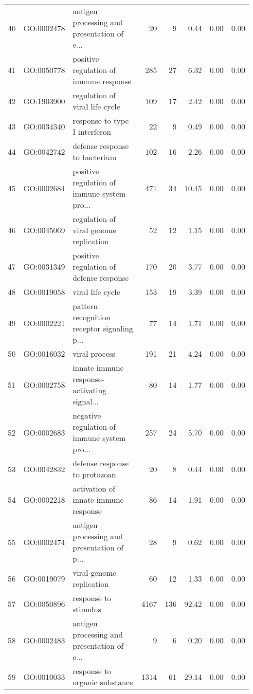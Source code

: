 \begin{table}[ht]
\begin{tabular}{rllrrrrr}
  40 & GO:0002478 & antigen processing and presentation of e... &  20 &   9 & 0.44 & 0.00 & 0.00 \\ 
  41 & GO:0050778 & positive regulation of immune response & 285 &  27 & 6.32 & 0.00 & 0.00 \\ 
  42 & GO:1903900 & regulation of viral life cycle & 109 &  17 & 2.42 & 0.00 & 0.00 \\ 
  43 & GO:0034340 & response to type I interferon &  22 &   9 & 0.49 & 0.00 & 0.00 \\ 
  44 & GO:0042742 & defense response to bacterium & 102 &  16 & 2.26 & 0.00 & 0.00 \\ 
  45 & GO:0002684 & positive regulation of immune system pro... & 471 &  34 & 10.45 & 0.00 & 0.00 \\ 
  46 & GO:0045069 & regulation of viral genome replication &  52 &  12 & 1.15 & 0.00 & 0.00 \\ 
  47 & GO:0031349 & positive regulation of defense response & 170 &  20 & 3.77 & 0.00 & 0.00 \\ 
  48 & GO:0019058 & viral life cycle & 153 &  19 & 3.39 & 0.00 & 0.00 \\ 
  49 & GO:0002221 & pattern recognition receptor signaling p... &  77 &  14 & 1.71 & 0.00 & 0.00 \\ 
  50 & GO:0016032 & viral process & 191 &  21 & 4.24 & 0.00 & 0.00 \\ 
  51 & GO:0002758 & innate immune response-activating signal... &  80 &  14 & 1.77 & 0.00 & 0.00 \\ 
  52 & GO:0002683 & negative regulation of immune system pro... & 257 &  24 & 5.70 & 0.00 & 0.00 \\ 
  53 & GO:0042832 & defense response to protozoan &  20 &   8 & 0.44 & 0.00 & 0.00 \\ 
  54 & GO:0002218 & activation of innate immune response &  86 &  14 & 1.91 & 0.00 & 0.00 \\ 
  55 & GO:0002474 & antigen processing and presentation of p... &  28 &   9 & 0.62 & 0.00 & 0.00 \\ 
  56 & GO:0019079 & viral genome replication &  60 &  12 & 1.33 & 0.00 & 0.00 \\ 
  57 & GO:0050896 & response to stimulus & 4167 & 136 & 92.42 & 0.00 & 0.00 \\ 
  58 & GO:0002483 & antigen processing and presentation of e... &   9 &   6 & 0.20 & 0.00 & 0.00 \\ 
  59 & GO:0010033 & response to organic substance & 1314 &  61 & 29.14 & 0.00 & 0.00 \\ 

\end{tabular}
\end{table}
